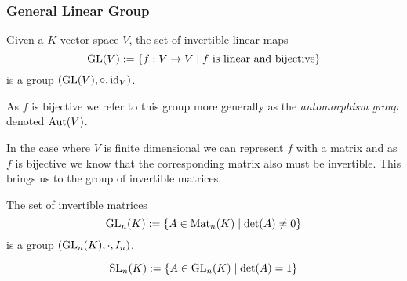 % 

\newpage

\subsubsection{General Linear Group}\label{sssec:gen_lin_grp}
\begin{proposition}
   Given a \(K\)-vector space \(V\), the set of invertible linear maps
   \[\operatorname{GL}(V) := \{f: V \to V \mid f~\text{is linear and bijective}\}\]
   is a group \((\operatorname{GL}(V), \circ, \operatorname{id}_V)\).
\end{proposition}
\begin{remark}
   As \(f\) is bijective we refer to this group more generally as the \emph{automorphism group} denoted \(\operatorname{Aut}(V)\).
\end{remark}

In the case where \(V\) is finite dimensional we can represent \(f\) with a matrix and as \(f\) is bijective we know that the corresponding matrix also must be invertible.
This brings us to the group of invertible matrices.

\begin{proposition}\label{pro:glm}
   The set of invertible matrices
   \[\operatorname{GL}_n(K) := \{A \in \operatorname{Mat}_n(K) \mid \det(A) \neq 0\}\]
   is a group \((\operatorname{GL}_n(K), \cdot, I_n)\).
\end{proposition}

\begin{proposition}
   \[\operatorname{SL}_n(K) := \{A \in \operatorname{GL}_n(K) \mid \det(A) = 1\}\]
\end{proposition}

